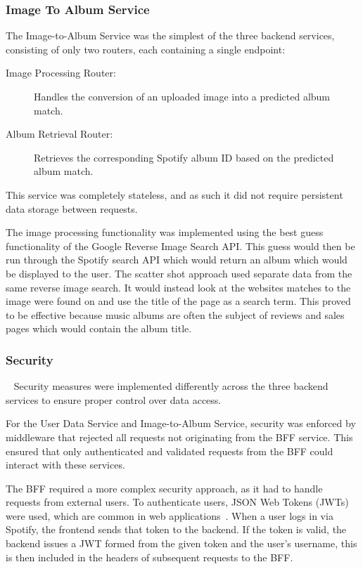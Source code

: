 \subsubsection{Image To Album Service}
The Image-to-Album Service was the simplest of the three backend services, consisting of only two routers, each containing a single endpoint:

\begin{description}
    \item[Image Processing Router:] Handles the conversion of an uploaded image into a predicted album match.
    \item[Album Retrieval Router:] Retrieves the corresponding Spotify album ID based on the predicted album match.
\end{description}

This service was completely stateless, and as such it did not require persistent data storage between requests.

The image processing functionality was implemented using the best guess functionality of the Google Reverse Image Search API. This guess would then be run through the Spotify search API which would return an album which would be displayed to the user. The scatter shot approach used separate data from the same reverse image search. It would instead look at the websites matches to the image were found on and use the title of the page as a search term. This proved to be effective because music albums are often the subject of reviews and sales pages which would contain the album title.



\subsubsection{Security}~\label{sec:backend-security}
Security measures were implemented differently across the three backend services to ensure proper control over data access.

For the User Data Service and Image-to-Album Service, security was enforced by middleware that rejected all requests not originating from the BFF service. This ensured that only authenticated and validated requests from the BFF could interact with these services.

The BFF required a more complex security approach, as it had to handle requests from external users. To authenticate users, JSON Web Tokens (JWTs) were used, which are common in web applications~\cite{9320801}. When a user logs in via Spotify, the frontend sends that token to the backend. If the token is valid, the backend issues a JWT formed from the given token and the user's username, this is then included in the headers of subsequent requests to the BFF.

